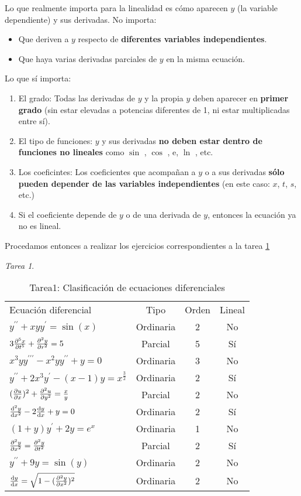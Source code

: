 \documentclass[12pt]{article} %
\theoremstyle{remark} %
\newtheorem{tarea}{Tarea}[section] %
\newcounter{ejercicio}[tarea]
\begin{document}
Lo que realmente importa para la linealidad es cómo aparecen $y$ (la variable dependiente) y sus derivadas.
No importa: 
\begin{itemize}
  \item Que deriven a $y$ respecto de \textbf{diferentes variables independientes}.
  \item Que haya varias derivadas parciales de $y$ en la misma ecuación.
\end{itemize}
Lo que sí importa:
\begin{enumerate}
\item El grado: Todas las derivadas de $y$ y la propia $y$ deben aparecer en \textbf{primer grado} (sin estar elevadas a potencias diferentes de 1, ni estar multiplicadas entre sí).
\item El tipo de funciones: $y$ y sus derivadas \textbf{no deben estar dentro de funciones no lineales} como $\sin$ , $\cos$ , e, $\ln$ , etc.
\item Los coeficintes: Los coeficientes que acompañan a $y$ o a sus derivadas \textbf{sólo pueden depender de las variables independientes} (en este caso: $x$, $t$, $s$, etc.)
\item Si el coeficiente depende de $y$ o de una derivada de $y$, entonces la ecuación ya no es lineal.
\end{enumerate}

Procedamos entonces a realizar los ejercicios correspondientes a la tarea \cref{tarea:clasificacion}

\begin{tarea} \label{tarea:clasificacion}
\begin{table}[H]
  \centering
  \caption{Tarea1: Clasificación de ecuaciones diferenciales}
  \label{tab:EjercicioClasificacion}
  \begin{tabular}{lccc}
    Ecuación diferencial & Tipo & Orden & Lineal \\[0.5em]
    $y^{\prime \prime} + xyy^{\prime} = \sin (x)$ & Ordinaria & 2 & No \\[0.6em]
    $3 \pdv[5]{x}{t} + \pdv[2]{y}{r} = 5$ & Parcial & 5 & Sí \\[0.6em]
    $x^3yy^{\prime \prime \prime} - x^2yy^{\prime \prime} + y = 0$ & Ordinaria & 3 & No \\[0.6em]
    $y^{\prime \prime} + 2x^3y^{\prime} - (x-1)y = x^{\frac{3}{2}}$ & Ordinaria & 2 & Sí \\[0.6em]
    $(\pdv{u}{x})^2 + \pdv[2]{u}{y} = \frac{x}{y}$ &Parcial & 2 & No \\[0.6em]
    $\dv[2]{y}{x} - 2 \dv{y}{x} + y = 0$ & Ordinaria & 2 & Sí \\[0.6em]
    $(1+y)y^{\prime} + 2y = e^x$ & Ordinaria & 1 & No \\[0.6em]
    $\pdv[2]{y}{x} = \pdv[2]{y}{t}$ & Parcial & 2 & Sí \\[0.6em]
    $y^{\prime \prime} + 9y = \sin (y)$ & Ordinaria & 2 & No \\[0.6em]
    $\dv{y}{x} = \sqrt{1 - (\pdv[2]{y}{x})^2}$ & Ordinaria & 2 & No
  \end{tabular}
\end{table}
\end{tarea}
\end{document}
